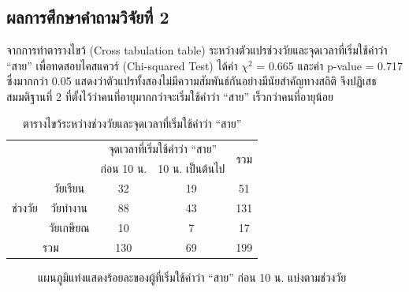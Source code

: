 \documentclass[a4paper]{article}
\begin{document}
\subsection{ผลการศึกษาคำถามวิจัยที่ 2}
    จากการทำตารางไขว้ (Cross tabulation table) ระหว่างตัวแปรช่วงวัยและจุดเวลาที่เริ่มใช้คำว่า “สาย” เพื่อทดสอบไคสแควร์ (Chi-squared Test) ได้ค่า $\chi^2$ = 0.665 และค่า p-value = 0.717 ซึ่งมากกว่า 0.05 แสดงว่าตัวแปรทั้งสองไม่มีความสัมพันธ์กันอย่างมีนัยสำคัญทางสถิติ จึงปฏิเสธสมมติฐานที่ 2 ที่ตั้งไว้ว่าคนที่อายุมากกว่าจะเริ่มใช้คำว่า “สาย” เร็วกว่าคนที่อายุน้อย
    \begin{table}[!ht]
        \begin{center}
        \begin{tabular}{|c|c|c|c|c|}
            \cline{3-5}
            \multicolumn{2}{c|}{} & \multicolumn{2}{c|}{จุดเวลาที่เริ่มใช้คำว่า “สาย”} & \multirow{2}{*}{รวม} \\
            \cline{3-4}
            \multicolumn{2}{c|}{} & ก่อน 10 น. & 10 น. เป็นต้นไป & \\
            \hline
            \multirow{3}{*}{ช่วงวัย} & วัยเรียน & 32 & 19 & 51 \\
            \cline{2-5}
            & วัยทำงาน & 88 & 43 & 131 \\
            \cline{2-5}
            & วัยเกษียณ & 10 & 7 & 17 \\
            \hline
            \multicolumn{2}{|c|}{รวม} & 130 & 69 & 199 \\
            \hline
        \end{tabular}
        \end{center}
        \caption{ตารางไขว้ระหว่างช่วงวัยและจุดเวลาที่เริ่มใช้คำว่า “สาย”}
    \end{table}
    \begin{figure}[!ht]
        \begin{center}
        \end{center}
        \caption{แผนภูมิแท่งแสดงร้อยละของผู้ที่เริ่มใช้คำว่า “สาย” ก่อน 10 น. แบ่งตามช่วงวัย}
    \end{figure}
\end{document}
